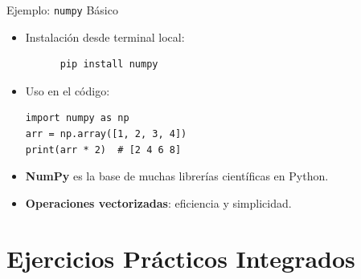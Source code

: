 \documentclass[10pt]{beamer}
\begin{document}
\begin{frame}[fragile]{Ejemplo: \texttt{numpy} Básico}
  \begin{itemize}
    \item Instalación desde terminal local:
    \begin{verbatim}
      pip install numpy
    \end{verbatim}
    \item Uso en el código:
    \begin{verbatim}
import numpy as np
arr = np.array([1, 2, 3, 4])
print(arr * 2)  # [2 4 6 8]
    \end{verbatim}
    \item \textbf{NumPy} es la base de muchas librerías científicas en Python.
    \item \textbf{Operaciones vectorizadas}: eficiencia y simplicidad.
  \end{itemize}
\end{frame}


\fi
\section{Ejercicios Prácticos Integrados}
\end{document}
